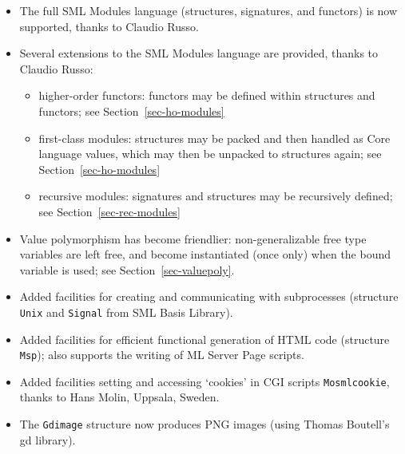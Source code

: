 \documentclass[fleqn]{article}
\begin{document}
\begin{itemize}
\item The full SML Modules language (structures, signatures, and
  functors) is now supported, thanks to Claudio Russo.
\item Several extensions to the SML Modules language are provided,
  thanks to Claudio Russo:
  \begin{itemize}
  \item higher-order functors: functors may be defined within
    structures and functors; see Section~\ref{sec-ho-modules}
  \item first-class modules: structures may be packed and then handled
    as Core language values, which may then be unpacked to structures
    again; see Section~\ref{sec-ho-modules}
  \item recursive modules: signatures and structures may be
    recursively defined; see Section~\ref{sec-rec-modules}
  \end{itemize}
\item Value polymorphism has become friendlier: non-generalizable free
  type variables are left free, and become instantiated (once only)
  when the bound variable is used; see Section~\ref{sec-valuepoly}.
\item Added facilities for creating and communicating with
  subprocesses (structure \texttt{Unix} and \texttt{Signal} from SML
  Basis Library).
\item Added facilities for efficient functional generation of HTML
  code (structure \texttt{Msp}); also supports the writing of ML
  Server Page scripts.
\item Added facilities setting and accessing `cookies' in CGI scripts
  \texttt{Mosmlcookie}, thanks to Hans Molin, Uppsala, Sweden.
\item The \texttt{Gdimage} structure now produces PNG images (using
  Thomas Boutell's gd library).
\end{itemize}


  
\end{document}
